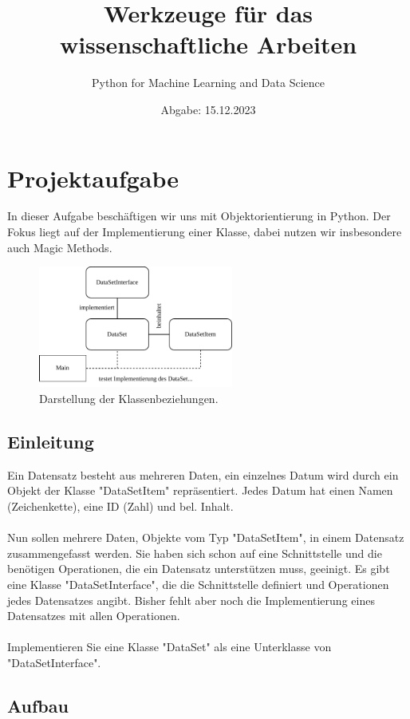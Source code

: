 \documentclass[oneside, 10pt, a4paper, parskip=full]{scrartcl}
\title{Werkzeuge für das wissenschaftliche Arbeiten}
\subtitle{Python for Machine Learning and Data Science}
\author{}
\date{\vspace{-1cm}Abgabe: 15.12.2023}
\begin{document}
\maketitle

\tableofcontents

\section{Projektaufgabe}

In dieser Aufgabe beschäftigen wir uns mit Objektorientierung in Python.
Der Fokus liegt auf der Implementierung einer Klasse, dabei nutzen wir insbesondere auch Magic Methods.

\begin{figure}
    \centering
    \includegraphics[height=4cm]{./../diagram/classes_files.pdf}
    \caption{Darstellung der Klassenbeziehungen.}
\end{figure}

\subsection{Einleitung}

Ein Datensatz besteht aus mehreren Daten, ein einzelnes Datum wird durch ein Objekt der Klasse "DataSetItem" repräsentiert.
Jedes Datum hat einen Namen (Zeichenkette), eine ID (Zahl) und bel. Inhalt.\\
\\
Nun sollen mehrere Daten, Objekte vom Typ "DataSetItem", in einem Datensatz zusammengefasst werden.
Sie haben sich schon auf eine Schnittstelle und die benötigen Operationen, die ein Datensatz unterstützen muss, geeinigt.
Es gibt eine Klasse "DataSetInterface", die die Schnittstelle definiert und Operationen jedes Datensatzes angibt.
Bisher fehlt aber noch die Implementierung eines Datensatzes mit allen Operationen.\\
\\
Implementieren Sie eine Klasse "DataSet" als eine Unterklasse von "DataSetInterface".

\subsection{Aufbau}
\end{document}
